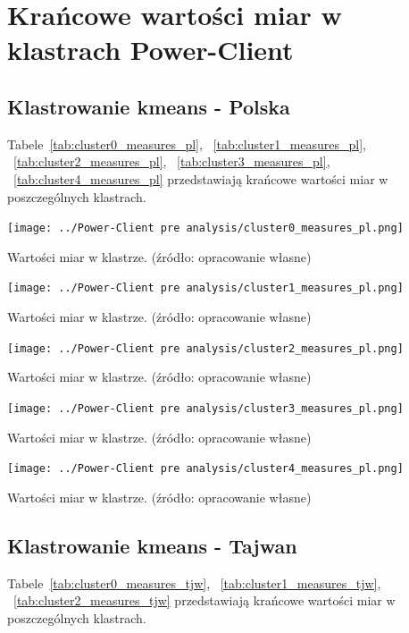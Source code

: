 \documentclass[11pt]{report}
\begin{document}
    \section{Krańcowe wartości miar w klastrach Power-Client}

    \subsection{Klastrowanie kmeans - Polska}\label{subsec:klastrowanie-kmeans---polska}
    Tabele~\ref{tab:cluster0_measures_pl},
    ~\ref{tab:cluster1_measures_pl},
    ~\ref{tab:cluster2_measures_pl},
    ~\ref{tab:cluster3_measures_pl},
    ~\ref{tab:cluster4_measures_pl}
    przedstawiają krańcowe wartości miar w poszczególnych klastrach.

    \begin{table}[!htp]
        \centering
        \texttt{[image: ../Power-Client pre analysis/cluster0\_measures\_pl.png]}
        \caption{Wartości miar w klastrze. (źródło: opracowanie własne)}
        \label{tab:cluster0_measures_pl}
    \end{table}
    \begin{table}[!htp]
        \centering
        \texttt{[image: ../Power-Client pre analysis/cluster1\_measures\_pl.png]}
        \caption{Wartości miar w klastrze. (źródło: opracowanie własne)}
        \label{tab:cluster1_measures_pl}
    \end{table}
    \begin{table}[!htp]
        \centering
        \texttt{[image: ../Power-Client pre analysis/cluster2\_measures\_pl.png]}
        \caption{Wartości miar w klastrze. (źródło: opracowanie własne)}
        \label{tab:cluster2_measures_pl}
    \end{table}
    \begin{table}[!htp]
        \centering
        \texttt{[image: ../Power-Client pre analysis/cluster3\_measures\_pl.png]}
        \caption{Wartości miar w klastrze. (źródło: opracowanie własne)}
        \label{tab:cluster3_measures_pl}
    \end{table}
    \begin{table}[!htp]
        \centering
        \texttt{[image: ../Power-Client pre analysis/cluster4\_measures\_pl.png]}
        \caption{Wartości miar w klastrze. (źródło: opracowanie własne)}
        \label{tab:cluster4_measures_pl}
    \end{table}

    \subsection{Klastrowanie kmeans - Tajwan}\label{subsec:klastrowanie-kmeans---tajwan}
    Tabele~\ref{tab:cluster0_measures_tjw},
    ~\ref{tab:cluster1_measures_tjw},
    ~\ref{tab:cluster2_measures_tjw}
    przedstawiają krańcowe wartości miar w poszczególnych klastrach.
\end{document}
